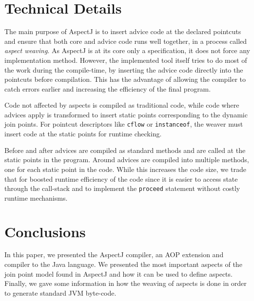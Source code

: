 \documentclass{template}
\begin{document}

\section{Technical Details}

The main purpose of AspectJ is to insert advice code at the declared pointcuts and ensure that
both core and advice code runs well together, in a process called \emph{aspect weaving}.
As AspectJ is at its core only a specification, it does not force any implementation method.
However, the implemented tool itself tries to do most of the work during the compile-time, by
inserting the advice code directly into the pointcuts before compilation. This has the advantage of
allowing the compiler to catch errors earlier and increasing the efficiency of the final program.

Code not affected by aspects is compiled as traditional code, while code where advices apply is
transformed to insert static points corresponding to the dynamic join points.
For pointcut descriptors like \texttt{cflow} or \texttt{instanceof}, the weaver must insert
code at the static points for runtime checking.

Before and after advices are compiled as standard methods and are called at the static points in
the program. Around advices are compiled into multiple methods, one for each static point in the code.
While this increases the code size, we trade that for boosted runtime efficiency of the code since
it is easier to access state through the call-stack and to implement the \texttt{proceed} statement
without costly runtime mechanisms.

\section{Conclusions}

In this paper, we presented the AspectJ compiler, an AOP extension and compiler to the Java language.
We presented the most important aspects of the join point model found in AspectJ and how it can be used
to define aspects. Finally, we gave some information in how the weaving of aspects is done in order to
generate standard JVM byte-code.




\balancecolumns
\end{document}
